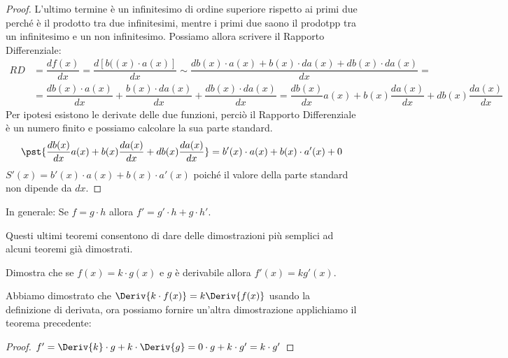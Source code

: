 \begin{proof}
L'ultimo termine è un infinitesimo di ordine superiore rispetto ai primi due 
perché è il prodotto tra due infinitesimi, mentre i primi due saono il prodotpp 
tra un infinitesimo e un non infinitesimo.
Possiamo allora scrivere il Rapporto Differenziale:
\begin{align*}
RD& = \dfrac{df(x)}{dx}=\dfrac{d[b((x) \cdot a(x)]}{dx} \sim 
      \dfrac{db(x) \cdot a(x)+b(x) \cdot da(x) + db(x) \cdot da(x)}{dx}=\\
&=\dfrac{db(x) \cdot a(x)}{dx}+
  \dfrac{b(x) \cdot da(x)}{dx}+
  \dfrac{db(x) \cdot da(x)}{dx}=
\dfrac{db(x)}{dx} a(x) + b(x)\dfrac{da(x)}{dx}  + db(x) \dfrac{da(x)}{dx}
\end{align*}
Per ipotesi esistono le derivate delle due funzioni, perciò 
il Rapporto Differenziale è un numero finito e possiamo calcolare la sua parte 
standard.
\[\pst{\dfrac{db(x)}{dx} a(x) + 
       b(x)\dfrac{da(x)}{dx} + 
       db(x) \dfrac{da(x)}{dx}} =
  b'(x) \cdot a(x) + b(x) \cdot a'(x) + 0\]
\(S'(x) = b'(x) \cdot a(x) + b(x) \cdot a'(x)\) 
poiché il valore della parte standard non dipende da \(dx\).
\end{proof}

In generale: \qquad
Se \quad \(f = g \cdot h\) \quad allora \quad 
\(f' = g' \cdot h + g \cdot h'\).

\begin{osservazione}
Questi ultimi teoremi consentono di dare delle dimostrazioni più semplici ad 
alcuni teoremi già dimostrati.
\end{osservazione}

\begin{esempio}
Dimostra che se \(f(x) = k \cdot g(x)\) e \(g\) è derivabile allora 
\(f'(x) = k g'(x)\).

Abbiamo dimostrato che \(\Deriv{k \cdot f(x)} = k \Deriv{f(x)}\) usando la 
definizione di derivata, ora possiamo fornire un'altra dimostrazione 
applichiamo il teorema precedente:
\begin{proof}
\qquad
\(f' = \Deriv{k} \cdot g + k \cdot \Deriv{g} =
0 \cdot g + k\cdot g' = k \cdot g'\)
\end{proof}
\end{esempio}

